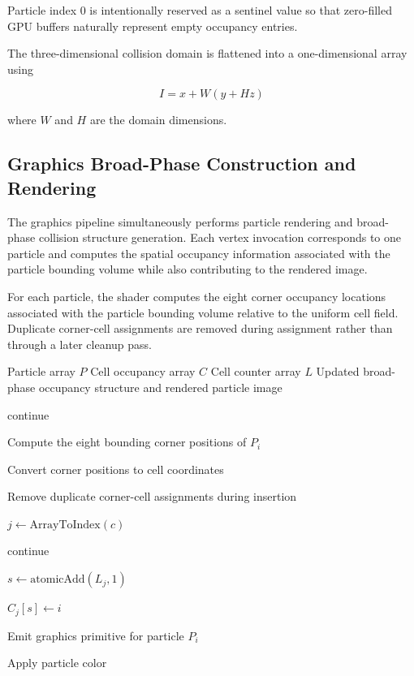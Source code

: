 \documentclass{article}
\begin{document}
Particle index \(0\) is intentionally reserved as a sentinel value so that zero-filled GPU buffers naturally represent empty occupancy entries.

The three-dimensional collision domain is flattened into a one-dimensional array using

\[
I = x + W(y + Hz)
\]

where \(W\) and \(H\) are the domain dimensions.

\subsection{Graphics Broad-Phase Construction and Rendering}

The graphics pipeline simultaneously performs particle rendering and broad-phase collision structure generation. Each vertex invocation corresponds to one particle and computes the spatial occupancy information associated with the particle bounding volume while also contributing to the rendered image.

For each particle, the shader computes the eight corner occupancy locations associated with the particle bounding volume relative to the uniform cell field. Duplicate corner-cell assignments are removed during assignment rather than through a later cleanup pass.

\begin{algorithm}
\caption{Graphics Broad-Phase Construction and Fragment Rendering}
\begin{algorithmic}[1]
\Require Particle array \(P\)
\Require Cell occupancy array \(C\)
\Require Cell counter array \(L\)
\Ensure Updated broad-phase occupancy structure and rendered particle image

        \State continue
    \EndIf

    \State Compute the eight bounding corner positions of \(P_i\)

    \State Convert corner positions to cell coordinates

    \State Remove duplicate corner-cell assignments during insertion

        \State \(j \gets \text{ArrayToIndex}(c)\)

            \State continue
        \EndIf

        \State \(s \gets \text{atomicAdd}(L_j,1)\)

            \State \(C_j[s] \gets i\)
        \EndIf
    \EndFor

    \State Emit graphics primitive for particle \(P_i\)
\EndFor

    \State Apply particle color
\EndFor

\end{algorithmic}
\end{algorithm}
\end{document}
